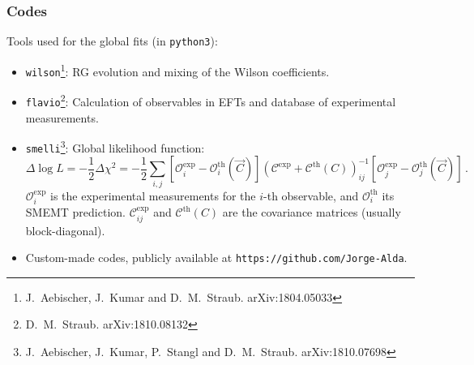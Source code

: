 \documentclass[mathserif, 10pt]{beamer}
\begin{document}
\begin{frame}\frametitle{Codes}
    Tools used for the global fits (in \texttt{python3}):
    \begin{itemize}
        \item \texttt{wilson}\footnote[4]{J.~Aebischer, J.~Kumar and D.~M.~Straub. arXiv:1804.05033}: RG evolution and mixing of the Wilson coefficients.
        \item \texttt{flavio}\footnote[5]{D.~M.~Straub. arXiv:1810.08132}: Calculation of observables in EFTs and database of experimental measurements.
        \item \texttt{smelli}\footnote[6]{J.~Aebischer, J.~Kumar, P.~Stangl and D.~M.~Straub. arXiv:1810.07698}: Global likelihood function:
              {\small$$\Delta \log L = -\frac{1}{2}\Delta\chi^2 = -\frac{1}{2}\sum_{i,j} [\mathcal{O}_i^\mathrm{exp} - \mathcal{O}^\mathrm{th}_i(\vec{C})] (\mathcal{C}^\mathrm{exp}+\mathcal{C}^\mathrm{th}(C))^{-1}_{ij} [\mathcal{O}_j^\mathrm{exp} - \mathcal{O}^\mathrm{th}_j(\vec{C})]\,. $$} %
              $\mathcal{O}_i^\mathrm{exp}$ is the experimental measurements for the $i$-th observable, and $\mathcal{O}_i^\mathrm{th}$ its SMEMT prediction. $\mathcal{C}_{ij}^\mathrm{exp}$ and $\mathcal{C}^\mathrm{th}(C)$ are the covariance matrices (usually block-diagonal).%
        \item Custom-made codes, publicly available at \texttt{https://github.com/Jorge-Alda}.
    \end{itemize}
\end{frame}
\end{document}
